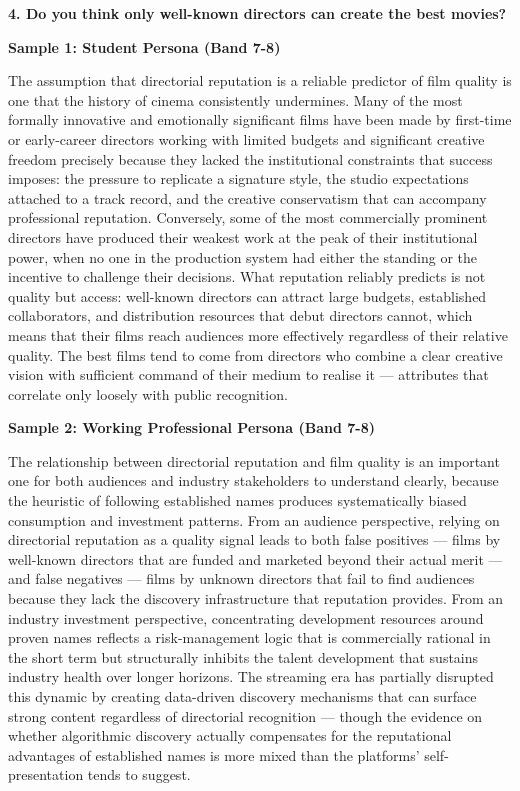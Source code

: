 \separator

\begin{ieltsquestion}
\textbf{4. Do you think only well-known directors can create the best movies?}
\end{ieltsquestion}
\textbf{Sample 1: Student Persona (Band 7-8)}

The assumption that directorial reputation is a reliable predictor of film quality is one that the history of cinema consistently undermines. Many of the most formally innovative and emotionally significant films have been made by first-time or early-career directors working with limited budgets and significant creative freedom precisely because they lacked the institutional constraints that success imposes: the pressure to replicate a signature style, the studio expectations attached to a track record, and the creative conservatism that can accompany professional reputation. Conversely, some of the most commercially prominent directors have produced their weakest work at the peak of their institutional power, when no one in the production system had either the standing or the incentive to challenge their decisions. What reputation reliably predicts is not quality but access: well-known directors can attract large budgets, established collaborators, and distribution resources that debut directors cannot, which means that their films reach audiences more effectively regardless of their relative quality. The best films tend to come from directors who combine a clear creative vision with sufficient command of their medium to realise it — attributes that correlate only loosely with public recognition.

\textbf{Sample 2: Working Professional Persona (Band 7-8)}

The relationship between directorial reputation and film quality is an important one for both audiences and industry stakeholders to understand clearly, because the heuristic of following established names produces systematically biased consumption and investment patterns. From an audience perspective, relying on directorial reputation as a quality signal leads to both false positives — films by well-known directors that are funded and marketed beyond their actual merit — and false negatives — films by unknown directors that fail to find audiences because they lack the discovery infrastructure that reputation provides. From an industry investment perspective, concentrating development resources around proven names reflects a risk-management logic that is commercially rational in the short term but structurally inhibits the talent development that sustains industry health over longer horizons. The streaming era has partially disrupted this dynamic by creating data-driven discovery mechanisms that can surface strong content regardless of directorial recognition — though the evidence on whether algorithmic discovery actually compensates for the reputational advantages of established names is more mixed than the platforms' self-presentation tends to suggest.

